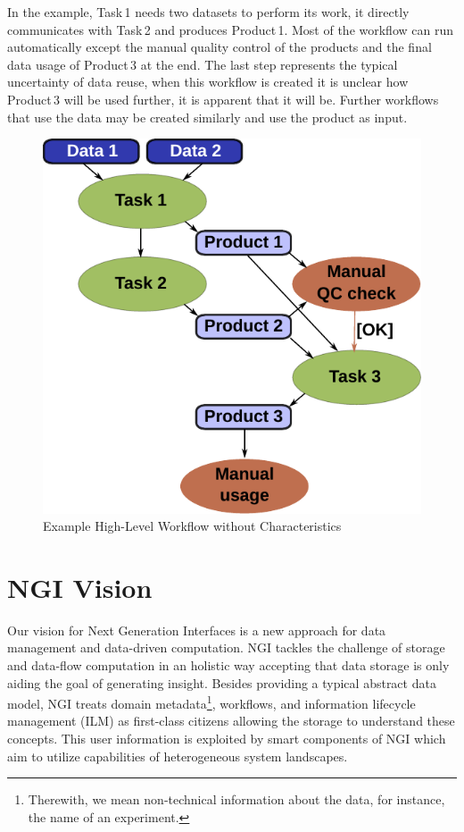 \documentclass[a4paper, twocolumn]{article}
\begin{document}
In the example, Task\,1 needs two datasets to perform its work, it directly communicates with Task\,2 and produces Product\,1.
Most of the workflow can run automatically except the manual quality control of the products and the final data usage of Product\,3 at the end.
The last step represents the typical uncertainty of data reuse, when this workflow is created it is unclear how Product\,3 will be used further, it is apparent that it will be.
Further workflows that use the data may be created similarly and use the product as input.


\begin{figure}[b]
  \centering
  \includegraphics[width=0.75\columnwidth]{workflow}
  \caption{Example High-Level Workflow without Characteristics}
  \label{fig:workflow}
\end{figure}




\section{NGI Vision}

Our vision for Next Generation Interfaces is a new approach for data management and data-driven computation.
NGI tackles the challenge of storage and data-flow computation in an holistic way accepting that data storage is only aiding the goal of generating insight.
Besides providing a typical abstract data model, NGI treats domain metadata\footnote{Therewith, we mean non-technical information about the data, for instance, the name of an experiment.}, workflows, and information lifecycle management (ILM) as first-class citizens allowing the storage to understand these concepts.
This user information is exploited by smart components of NGI which aim to utilize capabilities of  heterogeneous system landscapes.
\end{document}
